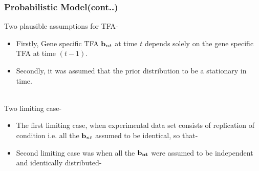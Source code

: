 \documentclass{beamer}
\begin{document}
\begin{frame}
\frametitle{Probabilistic Model(cont..)}

Two plausible assumptions for TFA-
\begin{itemize}
\item Firstly,  Gene specific TFA $ \bold{b}_{nt} $ at time $ t $ depends solely on the gene specific TFA at time $ (t-1) $. 
\item Secondly, it was assumed that the prior distribution to be a stationary in time. \\~\\
\end {itemize}

Two limiting case-
\begin{itemize}
\item The first limiting case, when experimental data set consists of replication of condition i.e. all the $ \bold{b}_{nt} $ assumed to be identical, so that- \\
\raggedright
\item Second limiting case was when all the $ \bold{ b_{nt}} $ were assumed to be independent and identically distributed- \\ 

\end{itemize}
\end{frame}

\end{document}
